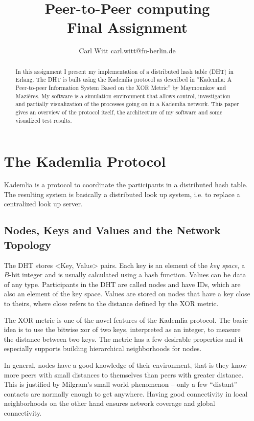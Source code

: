 \documentclass[a4paper,10pt,notitlepage]{article}
\title{Peer-to-Peer computing\\Final Assignment}
\author{Carl Witt {\small carl.witt@fu-berlin.de}}
\begin{document}
\maketitle

\begin{abstract}
In this assignment I present my implementation of a distributed hash table (DHT) in Erlang.
The DHT is built using the Kademlia protocol as described in ``Kademlia: A Peer-to-peer Information System Based on the XOR Metric'' by Maymounkov and Mazières.
My software is a simulation environment that allows control, investigation and partially visualization of the processes going on in a Kademlia network.
This paper gives an overview of the protocol itself, the architecture of my software and some visualized test results.
\end{abstract}

\section{The Kademlia Protocol}
Kademlia is a protocol to coordinate the participants in a distributed hash table.
The resulting system is basically a distributed look up system, i.e. to replace a centralized look up server.

\subsection{Nodes, Keys and Values and the Network Topology}
The DHT stores <Key, Value> pairs.
Each key is an element of the \emph{key space}, a $B$-bit integer and is usually calculated using a hash function.
Values can be data of any type.
Participants in the DHT are called nodes and have IDs, which are also an element of the key space.
Values are stored on nodes that have a key close to theirs, where close refers to the distance defined by the XOR metric.

The XOR metric is one of the novel features of the Kademlia protocol.
The basic idea is to use the bitwise xor of two keys, interpreted as an integer, to measure the distance between two keys.
The metric has a few desirable properties and it especially supports building hierarchical neighborhoods for nodes.

In general, nodes have a good knowledge of their environment, that is they know more peers with small distances to themselves than peers with greater distance.
This is justified by Milgram's small world phenomenon -- only a few ``distant'' contacts are normally enough to get anywhere.
Having good connectivity in local neighborhoods on the other hand ensures network coverage and global connectivity.
\end{document}
